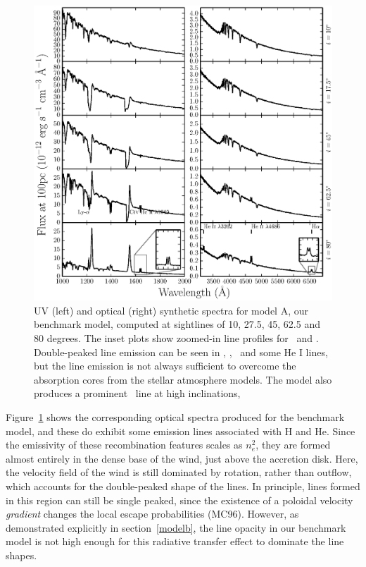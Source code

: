 \documentclass[preprint, a4paper, 11pt]{aastex}
\begin{document}
\begin{figure} %
\includegraphics[width=\textwidth]{figures/fig5_uv_opt.eps}
\caption{
UV (left) and optical (right) synthetic spectra for model A, our benchmark model,
computed at sightlines of 10, 27.5, 45, 62.5 and 80 degrees.	
The inset plots show zoomed-in line profiles for 
\heiiuv\ and \ha. Double-peaked line emission can be seen in 
\heiiuv, \heiiopt, \ha\ and some He I lines, but the 
line emission is not always sufficient to overcome the absorption
cores from the stellar atmosphere models. The model
also produces a prominent \heiioptnew\ line at high inclinations,
}
\label{spec}
\end{figure} %

Figure~\ref{spec} shows the corresponding optical spectra produced for
the benchmark model, and these do exhibit some emission lines
associated with H and He. Since the emissivity of these recombination 
features scales as $n_e^2$, they are formed almost entirely in the 
dense base of the wind, just above the accretion disk. Here, the
velocity field of the wind is still dominated by rotation, rather than
outflow, which accounts for the double-peaked shape of the lines. In
principle, lines formed in this region can still be single peaked,
since the existence of a poloidal velocity {\em gradient} changes the
local escape probabilities (MC96). However, as
demonstrated explicitly in section~\ref{modelb}, the line opacity in our
benchmark model is not high enough for this radiative transfer effect
to dominate the line shapes.
\end{document}
